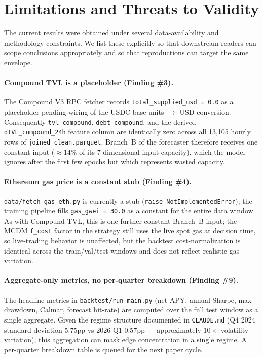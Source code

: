 
\section{Limitations and Threats to Validity}
\label{sec:limitations}

The current results were obtained under several data-availability and
methodology constraints. We list these explicitly so that downstream readers
can scope conclusions appropriately and so that reproductions can target
the same envelope.

\paragraph{Compound TVL is a placeholder (Finding \#3).}
The Compound V3 RPC fetcher records \texttt{total\_supplied\_usd = 0.0} as a
placeholder pending wiring of the USDC base-units $\to$ USD conversion.
Consequently \texttt{tvl\_compound}, \texttt{debt\_compound}, and the
derived \texttt{dTVL\_compound\_24h} feature column are identically zero
across all 13{,}105 hourly rows of \texttt{joined\_clean.parquet}. Branch~B
of the forecaster therefore receives one constant input
($\approx 14\%$ of its 7-dimensional input capacity), which the model
ignores after the first few epochs but which represents wasted capacity.

\paragraph{Ethereum gas price is a constant stub (Finding \#4).}
\texttt{data/fetch\_gas\_eth.py} is currently a stub
(\texttt{raise NotImplementedError}); the training pipeline fills
\texttt{gas\_gwei = 30.0} as a constant for the entire data window. As with
Compound TVL, this is one further constant Branch~B input; the MCDM
\texttt{f\_cost} factor in the strategy still uses the live spot gas at
decision time, so live-trading behavior is unaffected, but the
backtest cost-normalization is identical across the train/val/test
windows and does not reflect realistic gas variation.

\paragraph{Aggregate-only metrics, no per-quarter breakdown (Finding \#9).}
The headline metrics in \texttt{backtest/run\_main.py} (net APY, annual
Sharpe, max drawdown, Calmar, forecast hit-rate) are computed over the
full test window as a single aggregate. Given the regime structure
documented in \texttt{CLAUDE.md} (Q4 2024 standard deviation 5.75pp vs
2026 Q1 0.57pp --- approximately $10\times$ volatility variation), this
aggregation can mask edge concentration in a single regime. A per-quarter
breakdown table is queued for the next paper cycle.

